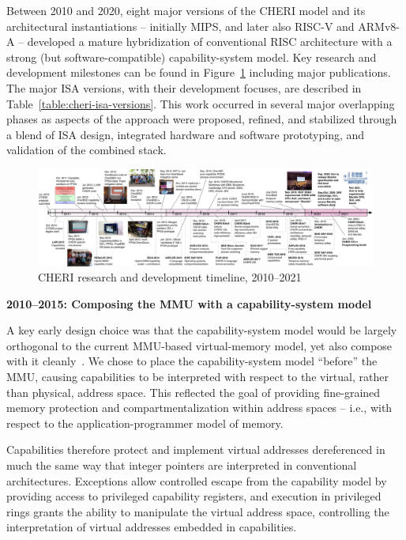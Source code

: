 Between 2010 and 2020, eight major versions of the CHERI model and its
architectural instantiations -- initially MIPS, and later also RISC-V and
ARMv8-A -- developed a
mature hybridization of conventional RISC architecture with a strong (but
software-compatible) capability-system model.
Key research and development milestones can be found in
Figure~\ref{fig:cheri-r-and-d} including major publications.
The major ISA versions, with their development focuses, are described in
Table~\ref{table:cheri-isa-versions}.
This work occurred in several major overlapping phases as aspects of the
approach were proposed, refined, and stabilized through a blend of ISA design,
integrated hardware and software prototyping, and validation of the combined
stack.

\begin{figure}
\begin{center}
\includegraphics[width=\columnwidth]{20200816-cheri-timeline.pdf}
\caption{CHERI research and development timeline, 2010--2021}
\label{fig:cheri-r-and-d}
\end{center}
\end{figure}

\medskip
\noindent
\textbf{2010--2015: Composing the MMU with a capability-system model}

\nopagebreak
\smallskip
\noindent
A key early design choice was that the capability-system model would be
largely orthogonal to the current MMU-based virtual-memory model, yet also
compose with it cleanly~\cite{woodruff:cheriisca2014}.
We chose to place the capability-system model ``before'' the MMU, causing
capabilities to be interpreted with respect to the virtual, rather than
physical, address space.
This reflected the goal of providing fine-grained memory protection and
compartmentalization within address spaces -- i.e., with respect to the
application-programmer model of memory.

Capabilities therefore protect and implement virtual addresses dereferenced in
much the same way that integer pointers are interpreted in conventional
architectures.
Exceptions allow controlled escape from the capability model by providing
access to privileged capability registers, and execution in privileged rings
grants the ability to manipulate the virtual address space, controlling the
interpretation of virtual addresses embedded in capabilities.

